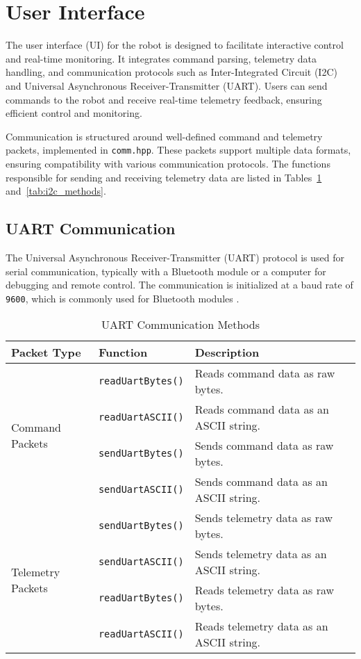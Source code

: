\section{User Interface}
The user interface (UI) for the robot is designed to facilitate interactive control and real-time monitoring. It integrates command parsing, telemetry data handling, and communication protocols such as Inter-Integrated Circuit (I2C) and Universal Asynchronous Receiver-Transmitter (UART). Users can send commands to the robot and receive real-time telemetry feedback, ensuring efficient control and monitoring.

Communication is structured around well-defined command and telemetry packets, implemented in \texttt{comm.hpp}. These packets support multiple data formats, ensuring compatibility with various communication protocols. The functions responsible for sending and receiving telemetry data are listed in Tables~\ref{tab:uart_methods} and~\ref{tab:i2c_methods}.

\subsection{UART Communication}
The Universal Asynchronous Receiver-Transmitter (UART) protocol is used for serial communication, typically with a Bluetooth module or a computer for debugging and remote control. The communication is initialized at a baud rate of \texttt{9600}, which is commonly used for Bluetooth modules \cite{bluetooth}.

\begin{table}[h]
	\centering
	\caption{UART Communication Methods}
	\begin{tabular}{|l|l|l|}
		\hline
		\textbf{Packet Type} & \textbf{Function} & \textbf{Description} \\ \hline
		\multirow{4}{*}{Command Packets} & \texttt{readUartBytes()} & Reads command data as raw bytes. \\ \cline{2-3}
		& \texttt{readUartASCII()} & Reads command data as an ASCII string. \\ \cline{2-3}
		& \texttt{sendUartBytes()} & Sends command data as raw bytes. \\ \cline{2-3}
		& \texttt{sendUartASCII()} & Sends command data as an ASCII string. \\ \hline
		\multirow{4}{*}{Telemetry Packets} & \texttt{sendUartBytes()} & Sends telemetry data as raw bytes. \\ \cline{2-3}
		& \texttt{sendUartASCII()} & Sends telemetry data as an ASCII string. \\ \cline{2-3}
		& \texttt{readUartBytes()} & Reads telemetry data as raw bytes. \\ \cline{2-3}
		& \texttt{readUartASCII()} & Reads telemetry data as an ASCII string. \\ \hline
	\end{tabular}
	\label{tab:uart_methods}
\end{table}


